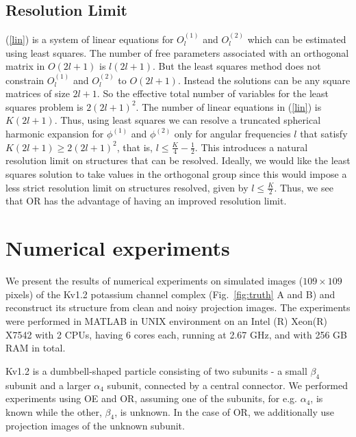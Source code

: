 \documentclass{article}
\begin{document}
\subsection{Resolution Limit}
(\ref{lin}) is a system of linear equations for $O_l^{(1)}$ and $O_l^{(2)}$
which can be estimated using least squares.
The number of free parameters associated with an orthogonal matrix in
$O(2l+1)$ is $l(2l+1)$. But the least squares
method does not constrain $O_l^{(1)}$ and $O_l^{(2)}$ to $O(2l+1)$.
Instead the solutions can be any
square matrices of size $2l+1$. So the effective total number of
variables for the least squares problem
is $2(2l+1)^2$. The number of linear equations in (\ref{lin}) is $K(2l+1)$.
Thus, using least squares we can resolve a truncated
spherical harmonic expansion
for $\phi^{(1)}$ and $\phi^{(2)}$ only for angular frequencies $l$ that satisfy
$K(2l+1) \geq 2(2l+1)^2$, that is, $l \leq \frac{K}{4} - \frac{1}{2}$.
This introduces a natural resolution limit on structures that can be resolved.
Ideally, we would like the least squares solution to take values in the orthogonal
group since this would impose a less strict resolution
limit on structures resolved, given by $l \leq \frac{K}{2}$. Thus, we see
that OR has the advantage of having an improved resolution limit.

\section{Numerical experiments}

We present the results of numerical experiments on simulated images ($109\times 109$ pixels) of the Kv1.2 potassium
channel complex (Fig.~\ref{fig:truth} A and B) and reconstruct its structure from clean and noisy
projection images. The experiments were performed in MATLAB in UNIX environment on an
Intel (R) Xeon(R) X7542 with 2 CPUs, having 6 cores each, running at 2.67 GHz, and with
256 GB RAM in total. 

Kv1.2 is a dumbbell-shaped particle consisting of two subunits - a small $\beta_4$ subunit
and a larger $\alpha_4$ subunit, connected by a central connector. We performed
experiments using OE and OR, assuming one of the subunits, for e.g. $\alpha_4$,  is known
while the other, $\beta_4$, is unknown. In the case of OR, we additionally use projection
images of the unknown subunit. 


\end{document}
